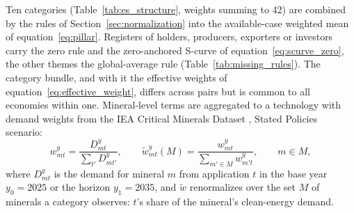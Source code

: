 Ten categories (Table~\ref{tab:es_structure}, weights summing to 42) are combined by the rules of
Section~\ref{sec:normalization} into the available-case weighted mean of
equation~\eqref{eq:pillar}. Registers of holders, producers, exporters or investors carry the zero
rule and the zero-anchored S-curve of equation~\eqref{eq:scurve_zero}, the other themes the
global-average rule (Table~\ref{tab:missing_rules}). The category bundle, and with it the effective
weights of equation~\eqref{eq:effective_weight}, differs across pairs but is common to all
economies within one. Mineral-level terms are aggregated to a technology with demand weights from
the IEA Critical Minerals Dataset \citep{iea2026cmdata}, Stated Policies scenario:
\begin{equation}\label{eq:es_demand_weights}
  w^{y}_{mt}=\frac{D^{y}_{mt}}{\sum_{t'}D^{y}_{mt'}},\qquad
  \tilde w^{y}_{mt}(M)=\frac{w^{y}_{mt}}{\sum_{m'\in M}w^{y}_{m't}},\qquad m\in M,
\end{equation}
where $D^{y}_{mt}$ is the demand for mineral $m$ from application $t$ in the base year $y_0=2025$
or the horizon $y_1=2035$, and $\tilde w$ renormalizes over the set $M$ of minerals a category
observes: $t$'s share of the mineral's clean-energy demand.

